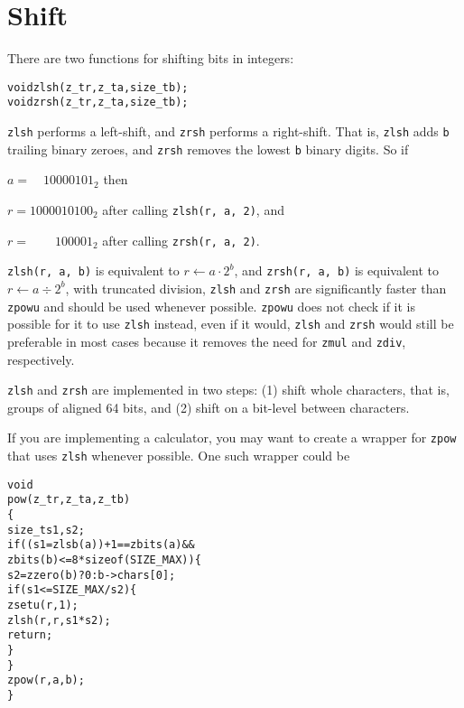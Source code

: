 \newpage
\section{Shift}
\label{sec:Shift}

There are two functions for shifting bits
in integers:

\begin{alltt}
   void zlsh(z_t r, z_t a, size_t b);
   void zrsh(z_t r, z_t a, size_t b);
\end{alltt}

\noindent
{\tt zlsh} performs a left-shift, and {\tt zrsh}
performs a right-shift. That is, {\tt zlsh} adds
{\tt b} trailing binary zeroes, and {\tt zrsh}
removes the lowest {\tt b} binary digits. So if

$a = \phantom{00}10000101_2$ then

$r = 1000010100_2$ after calling {\tt zlsh(r, a, 2)}, and

$r = \phantom{0100}100001_2$ after calling {\tt zrsh(r, a, 2)}.
\vspace{1em}

{\tt zlsh(r, a, b)} is equivalent to $r \gets a \cdot 2^b$,
and {\tt zrsh(r, a, b)} is equivalent to $r \gets a \div 2^b$,
with truncated division, {\tt zlsh} and {\tt zrsh} are
significantly faster than {\tt zpowu} and should be used
whenever possible. {\tt zpowu} does not check if it is
possible for it to use {\tt zlsh} instead, even if it
would, {\tt zlsh} and {\tt zrsh} would still be preferable
in most cases because it removes the need for {\tt zmul}
and {\tt zdiv}, respectively.

{\tt zlsh} and {\tt zrsh} are implemented in two steps:
(1) shift whole characters, that is, groups of aligned
64 bits, and (2) shift on a bit-level between characters.

If you are implementing a calculator, you may want to
create a wrapper for {\tt zpow} that uses {\tt zlsh}
whenever possible. One such wrapper could be

\begin{alltt}
   void
   pow(z_t r, z_t a, z_t b)
   \{
       size_t s1, s2;
       if ((s1 = zlsb(a)) + 1 == zbits(a) &&
                     zbits(b) <= 8 * sizeof(SIZE_MAX)) \{
           s2 = zzero(b) ? 0 : b->chars[0];
           if (s1 <= SIZE_MAX / s2) \{
               zsetu(r, 1);
               zlsh(r, r, s1 * s2);
               return;
           \}
       \}
       zpow(r, a, b);
   \}
\end{alltt}


